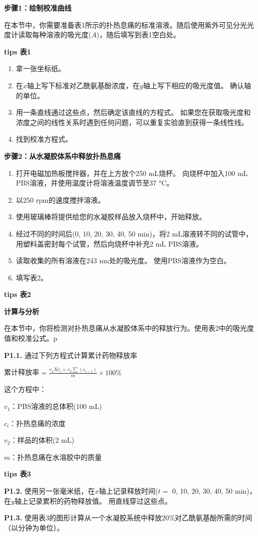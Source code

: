 \noindent \textbf{步骤1：绘制校准曲线}

在本节中，你需要准备表1所示的扑热息痛的标准溶液。随后使用紫外可见分光光度计读取每种溶液的吸光度(\(A\))，随后填写到表1空白处。

\textbf{tips 表1}

\begin{enumerate}
\tightlist
\item
  拿一张坐标纸。
\item
  在\(x\)轴上写下标准对乙酰氨基酚浓度，在\(y\)轴上写下相应的吸光度值。
  确认轴的单位。
\item
  用一条直线通过这些点，然后确定该直线的方程式。
  如果您在获取吸光度和浓度之间的线性关系时遇到任何问题，可以重复实验直到获得一条线性线。
\item
  找到校准方程式。
\end{enumerate}

\noindent \textbf{步骤2：从水凝胶体系中释放扑热息痛}

\begin{enumerate}
\tightlist
\item
  打开电磁加热板搅拌器，并在上方放个250 mL烧杯。 向烧杯中加入100 mL
  PBS溶液，并使用温度计将溶液温度调节至37 °C。
\item
  以250 rpm的速度搅拌溶液。
\item
  使用玻璃棒将提供给您的水凝胶样品放入烧杯中，开始释放。
\item
  经过不同的时间后(0, 10, 20, 30, 40, 50 min)，将2
  mL溶液转不同的试管中，用塑料盖密封每个试管，然后向烧杯中补充2 mL
  PBS溶液。
\item
  读取收集的所有溶液在243 nm处的吸光度。 使用PBS溶液作为空白。
\item
  填写表2。
\end{enumerate}

\textbf{tips 表2}

\noindent \textbf{计算与分析}

在本节中，你将检测对扑热息痛从水凝胶体系中的释放行为。使用表2中的吸光度值和校准公式。p

\noindent\textbf{P1.1.} 通过下列方程式计算累计药物释放率

\begin{center}
	累计释放率\(=\frac{v_1Xc_i+v_2\sum(c_{i-1})}{m}\times100\%\)
\end{center}

这个方程中：

\(v_1\)：PBS溶液的总体积(100 mL)

\(c_i\)：扑热息痛的浓度

\(v_2\)：样品的体积(2 mL)

\(m\)：扑热息痛在水溶胶中的质量

\textbf{tips 表3}

\noindent\textbf{P1.2.} 使用另一张毫米纸，在\(x\)轴上记录释放时间(\(t=\) 0, 10,
20, 30, 40, 50 min)，在\(y\)轴上记录累积的药物释放值。
用直线穿过这些点。

\noindent\textbf{P1.3.}
使用表3的图形计算从一个水凝胶系统中释放20\%对乙酰氨基酚所需的时间（以分钟为单位）。
